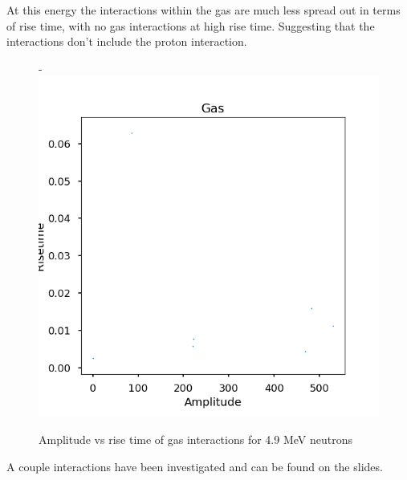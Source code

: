 \documentclass[a4paper]{article}
\begin{document}
\noindent At this energy the interactions within the gas are much less spread out in terms of rise time, with no gas interactions at high rise time. Suggesting that the interactions don't include the proton interaction.
\begin{figure}[H]-
        \centering
        \includegraphics[width=.5\linewidth]{Fast/steel_achinos_gas3_fast-4.png}
        \caption{Amplitude vs rise time of gas interactions for 4.9 MeV neutrons}
        \label{fig:south2d}
        \end{figure}
\noindent A couple interactions have been investigated and can be found on the slides.
\end{document}
